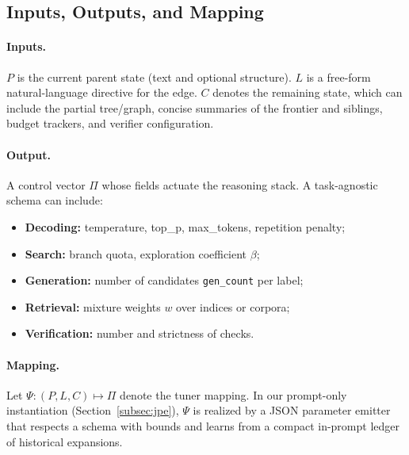 \documentclass{article}
\theoremstyle{plain}
\theoremstyle{definition}
\theoremstyle{remark}
\begin{document}
\subsection{Inputs, Outputs, and Mapping}
\paragraph{Inputs.} $P$ is the current parent state (text and optional structure). $L$ is a free-form natural-language directive for the edge. $C$ denotes the remaining state, which can include the partial tree/graph, concise summaries of the frontier and siblings, budget trackers, and verifier configuration.
\paragraph{Output.} A control vector $\Pi$ whose fields actuate the reasoning stack. A task-agnostic schema can include:
\begin{itemize}
  \item \textbf{Decoding:} temperature, top\_p, max\_tokens, repetition penalty;
  \item \textbf{Search:} branch quota, exploration coefficient $\beta$;
  \item \textbf{Generation:} number of candidates \texttt{gen\_count} per label;
  \item \textbf{Retrieval:} mixture weights $w$ over indices or corpora;
  \item \textbf{Verification:} number and strictness of checks.
\end{itemize}
\paragraph{Mapping.} Let $\Psi : (P,L,C)\mapsto \Pi$ denote the tuner mapping. In our prompt-only instantiation (Section~\ref{subsec:jpe}), $\Psi$ is realized by a JSON parameter emitter that respects a schema with bounds and learns from a compact in-prompt ledger of historical expansions.
\end{document}
